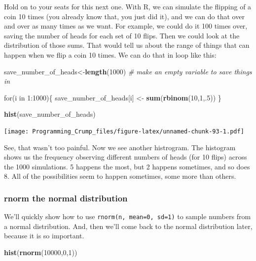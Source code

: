 \documentclass[]{book}
\newenvironment{Shaded}{\begin{snugshade}}{\end{snugshade}}
\newcommand{\KeywordTok}[1]{\textcolor[rgb]{0.13,0.29,0.53}{\textbf{{#1}}}}
\newcommand{\DecValTok}[1]{\textcolor[rgb]{0.00,0.00,0.81}{{#1}}}
\newcommand{\StringTok}[1]{\textcolor[rgb]{0.31,0.60,0.02}{{#1}}}
\newcommand{\CommentTok}[1]{\textcolor[rgb]{0.56,0.35,0.01}{\textit{{#1}}}}
\newcommand{\NormalTok}[1]{{#1}}
\theoremstyle{definition}
\theoremstyle{definition}
\theoremstyle{definition}
\theoremstyle{remark}
\begin{document}
Hold on to your seats for this next one. With R, we can simulate the
flipping of a coin 10 times (you already know that, you just did it),
and we can do that over and over as many times as we want. For example,
we could do it 100 times over, saving the number of heads for each set
of 10 flips. Then we could look at the distribution of those sums. That
would tell us about the range of things that can happen when we flip a
coin 10 times. We can do that in loop like this:

\begin{Shaded}
\begin{Highlighting}[]
\NormalTok{save_number_of_heads<-}\KeywordTok{length}\NormalTok{(}\DecValTok{1000}\NormalTok{) }\CommentTok{# make an empty variable to save things in}

\NormalTok{for(i in }\DecValTok{1}\NormalTok{:}\DecValTok{1000}\NormalTok{)\{}
  \NormalTok{save_number_of_heads[i] <-}\StringTok{ }\KeywordTok{sum}\NormalTok{(}\KeywordTok{rbinom}\NormalTok{(}\DecValTok{10}\NormalTok{,}\DecValTok{1}\NormalTok{,.}\DecValTok{5}\NormalTok{))}
\NormalTok{\}}

\KeywordTok{hist}\NormalTok{(save_number_of_heads)}
\end{Highlighting}
\end{Shaded}

\texttt{[image: Programming\_Crump\_files/figure-latex/unnamed-chunk-93-1.pdf]}

See, that wasn't too painful. Now we see another histrogram. The
histogram shows us the frequency observing different numbers of heads
(for 10 flips) across the 1000 simulations. 5 happens the most, but 2
happens sometimes, and so does 8. All of the possibilities seem to
happen sometimes, some more than others.

\subsubsection{rnorm the normal
distribution}\label{rnorm-the-normal-distribution}

We'll quickly show how to use \texttt{rnorm(n,\ mean=0,\ sd=1)} to
sample numbers from a normal distribution. And, then we'll come back to
the normal distribution later, because it is so important.

\begin{Shaded}
\begin{Highlighting}[]
\KeywordTok{hist}\NormalTok{(}\KeywordTok{rnorm}\NormalTok{(}\DecValTok{10000}\NormalTok{,}\DecValTok{0}\NormalTok{,}\DecValTok{1}\NormalTok{))}
\end{Highlighting}
\end{Shaded}
\end{document}
